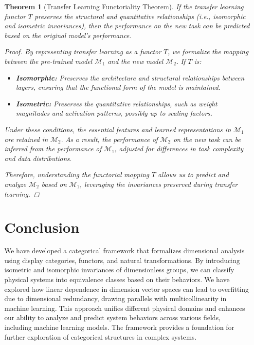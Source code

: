 \documentclass{article}
\newtheorem{theorem}{Theorem}[section]
\theoremstyle{definition}
\theoremstyle{remark}
\begin{document}
	\begin{theorem}[Transfer Learning Functoriality Theorem]
		If the transfer learning functor $T$ preserves the structural and quantitative relationships (i.e., isomorphic and isometric invariances), then the performance on the new task can be predicted based on the original model's performance.
		
		\begin{proof}
			By representing transfer learning as a functor $T$, we formalize the mapping between the pre-trained model $\mathcal{M}_1$ and the new model $\mathcal{M}_2$. If $T$ is:
			\begin{itemize}
				\item \textbf{Isomorphic:} Preserves the architecture and structural relationships between layers, ensuring that the functional form of the model is maintained.
				\item \textbf{Isometric:} Preserves the quantitative relationships, such as weight magnitudes and activation patterns, possibly up to scaling factors.
			\end{itemize}
			
			Under these conditions, the essential features and learned representations in $\mathcal{M}_1$ are retained in $\mathcal{M}_2$. As a result, the performance of $\mathcal{M}_2$ on the new task can be inferred from the performance of $\mathcal{M}_1$, adjusted for differences in task complexity and data distributions.
			
			Therefore, understanding the functorial mapping $T$ allows us to predict and analyze $\mathcal{M}_2$ based on $\mathcal{M}_1$, leveraging the invariances preserved during transfer learning.
		\end{proof}
	\end{theorem}
	
	\section{Conclusion}
	
	We have developed a categorical framework that formalizes dimensional analysis using display categories, functors, and natural transformations. By introducing isometric and isomorphic invariances of dimensionless groups, we can classify physical systems into equivalence classes based on their behaviors. We have explored how linear dependence in dimension vector spaces can lead to overfitting due to dimensional redundancy, drawing parallels with multicollinearity in machine learning. This approach unifies different physical domains and enhances our ability to analyze and predict system behaviors across various fields, including machine learning models. The framework provides a foundation for further exploration of categorical structures in complex systems.
	
\end{document}
